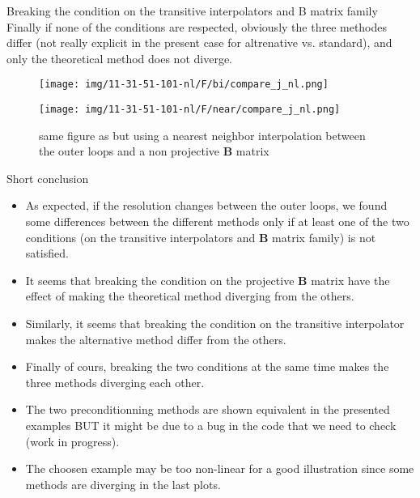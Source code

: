 \documentclass[8pt]{beamer}
\begin{document}
\begin{frame}{Breaking the condition on the transitive interpolators and B matrix family}
Finally if none of the conditions are respected, obviously the three methodes differ (not really explicit in the present case for altrenative vs. standard), and only the theoretical method does not diverge.
\begin{center}
\begin{figure}
  \begin{minipage}[c]{0.48\textwidth}
    \texttt{[image: img/11-31-51-101-nl/F/bi/compare\_j\_nl.png]}
    \caption{same figure as  but using a bilinear interpolation between the outer loops and a non projective $\mathbf{B}$ matrix}
  \end{minipage}\hfill
  \begin{minipage}[c]{0.48\textwidth}
  \texttt{[image: img/11-31-51-101-nl/F/near/compare\_j\_nl.png]}
    \caption{same figure as  but using a nearest neighbor interpolation between the outer loops and a non projective $\mathbf{B}$ matrix}
  \end{minipage}
\end{figure}
\end{center}
\end{frame}



\begin{frame}{Short conclusion}
\begin{itemize}
\item As expected, if the resolution changes between the outer loops, we found some differences between the different methods only if at least one of the two conditions (on the transitive interpolators and $\mathbf{B}$ matrix family) is not satisfied.
\item It seems that breaking the condition on the projective $\mathbf{B}$ matrix have the effect of making the theoretical method diverging from the others.
\item Similarly, it seems that breaking the condition on the transitive interpolator makes the alternative method differ from the others.
\item Finally of cours, breaking the two conditions at the same time makes the three methods diverging each other.
\item The two preconditionning methods are shown equivalent in the presented examples BUT it might be due to a bug in the code that we need to check (work in progress).
\item The choosen example may be too non-linear for a good illustration since some methods are diverging in the last plots.
\end{itemize}
\end{frame}
\end{document}
